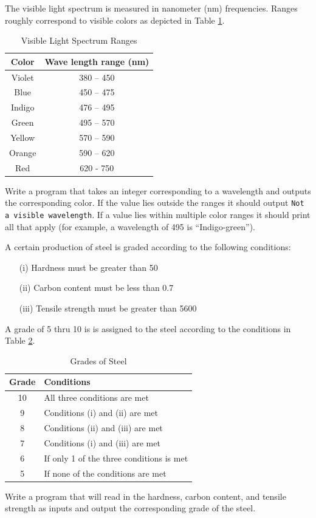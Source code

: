 \begin{exer}
The visible light spectrum is measured in nanometer (nm) frequencies.  Ranges roughly correspond to 
visible colors as depicted in Table \ref{table:lightSpectrum}.

\begin{table}[h]
\centering
\begin{tabular}{|c|c|}
\hline
Color & Wave length range (nm) \\
\hline
\hline
Violet &  380 -- 450 \\
\hline
Blue & 450 -- 475 \\
\hline
Indigo & 476 -- 495 \\
\hline
Green & 495 -- 570 \\
\hline
Yellow & 570 -- 590 \\
\hline
Orange & 590 -- 620 \\
\hline
Red & 620 - 750\\
\hline
\end{tabular}
\caption{Visible Light Spectrum Ranges}
\label{table:lightSpectrum}
\end{table}
Write a program that takes an integer corresponding to a wavelength and 
outputs the corresponding color.  If the value lies outside the ranges it should 
output \texttt{Not a visible wavelength}.  If a value lies within multiple color 
ranges it should print all that apply (for example, a wavelength of 495 is 
``Indigo-green'').
\end{exer}

\begin{exer}
A certain production of steel is graded according to the following conditions:
\begin{enumerate}
  \item[(i)] Hardness must be greater than 50
  \item[(ii)] Carbon content must be less than 0.7
  \item[(iii)] Tensile strength must be greater than 5600
\end{enumerate}
A grade of 5 thru 10 is is assigned to the steel according to the conditions in Table \ref{table:steelGrades}.
\begin{table}[h]
\centering
\begin{tabular}{|c|l|}
\hline
Grade & Conditions \\
\hline
\hline
10 & All three conditions are met \\
\hline
9   & Conditions (i) and (ii) are met \\
\hline
8  & Conditions (ii) and (iii) are met\\
\hline
7  & Conditions (i) and (iii) are met \\
\hline
6 & If only 1 of the three conditions is met \\
\hline
5  & If none of the conditions are met \\
\hline
\end{tabular}
\caption{Grades of Steel}
\label{table:steelGrades}
\end{table}
Write a program that will read in the hardness, carbon content, and tensile strength as inputs and output the 
corresponding grade of the steel.
\end{exer}

